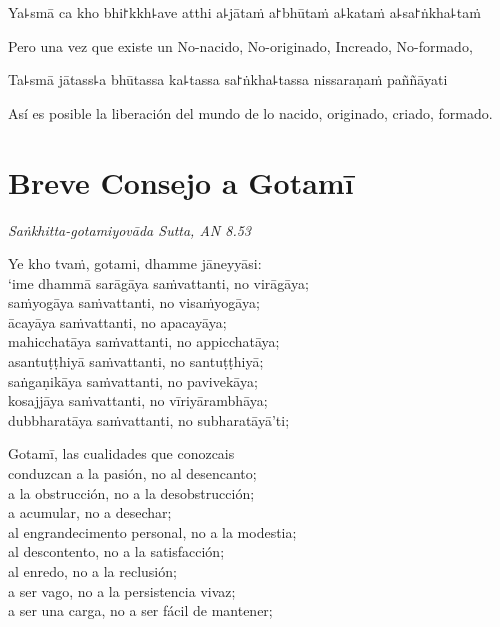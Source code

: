 Ya꜕smā ca kho bhi꜓kkh꜕ave atthi a꜕jātaṁ a꜓bhūtaṁ a꜕kataṁ a꜕sa꜓ṅkha꜕taṁ

\begin{english}
  Pero una vez que existe un No-nacido, No-originado, Increado, No-formado,
\end{english}

Ta꜕smā jātass꜕a bhūtassa ka꜕tassa sa꜓ṅkha꜕tassa nissaraṇaṁ paññāyati

\begin{english}
  Así es posible la liberación del mundo de lo nacido, originado, criado, formado.
\end{english}

\chapter[Breve Consejo a Gotamī]{Breve Consejo a Gotamī}

\emph{Saṅkhitta-gotamiyovāda Sutta, AN 8.53}


\begin{leader}
\end{leader}

Ye kho tvaṁ, gotami, dhamme jāneyyāsi:\\
‘ime dhammā sarāgāya saṁvattanti, no virāgāya;\\
saṁyogāya saṁvattanti, no visaṁyogāya;\\
ācayāya saṁvattanti, no apacayāya;\\
mahicchatāya saṁvattanti, no appicchatāya;\\
asantuṭṭhiyā saṁvattanti, no santuṭṭhiyā;\\
saṅgaṇikāya saṁvattanti, no pavivekāya;\\
kosajjāya saṁvattanti, no vīriyārambhāya;\\
dubbharatāya saṁvattanti, no subharatāyā’ti;

\begin{english}
  Gotamī, las cualidades que conozcais\\
  conduzcan a la pasión, no al desencanto;\\
  a la obstrucción, no a la desobstrucción;\\
  a acumular, no a desechar;\\
  al engrandecimento personal, no a la modestia;\\
  al descontento, no a la satisfacción;\\
  al enredo, no a la reclusión;\\
  a ser vago, no a la persistencia vivaz;\\
  a ser una carga, no a ser fácil de mantener;
\end{english}

